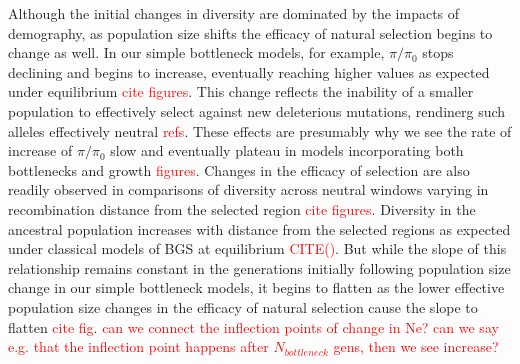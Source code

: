 \documentclass[9pt,twocolumn,twoside]{rilabRxiv}
\newcommand{\jri}[1]{{\small \textcolor{red}{#1}}}
\newcommand{\citex}[1]{{\small \textcolor{red}{CITE(#1)}}}
\begin{document}
Although the initial changes in diversity are dominated by the impacts of demography, as population size shifts the efficacy of natural selection begins to change as well.
In our simple bottleneck models, for example,  $\pi/\pi_0$ stops declining and begins to increase, eventually reaching higher values as expected under equilibrium \jri{cite figures}.
This change reflects the inability of a smaller population to effectively select against new deleterious mutations, rendinerg such alleles effectively neutral \jri{refs}.
These effects are presumably why we see the rate of increase of $\pi/\pi_0$ slow and eventually plateau in models incorporating both bottlenecks and growth \jri{figures}.
Changes in the efficacy of selection are also readily observed in comparisons of diversity across neutral windows varying in recombination distance from the selected region \jri{cite figures}.
Diversity in the ancestral population increases with  distance from the selected regions as expected under classical models of BGS at equilibrium \citex{}. 
But while the slope of this relationship remains constant in the generations initially following population size change in our simple bottleneck models, it begins to flatten as the lower effective population size changes in the efficacy of natural selection cause the slope to flatten  \jri{cite fig}.
\jri{can we connect the inflection points of change in Ne? can we say e.g. that the inflection point happens after $N_{bottleneck}$ gens, then we see increase?}
\end{document}
